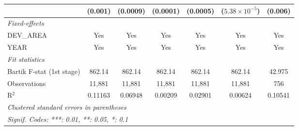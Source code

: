 \begin{table}[htbp]
{\begin{tabular}{lcccccc}
                                          & (0.001)                                   & (0.0009)                                    & (0.0001)                                        & (0.0005)                                  & ($5.38\times 10^{-5}$)                     & (0.006)\\   
      \midrule
      \emph{Fixed-effects}\\
      DEV\_AREA                           & Yes                                       & Yes                                         & Yes                                             & Yes                                       & Yes                                        & Yes\\  
      YEAR                                & Yes                                       & Yes                                         & Yes                                             & Yes                                       & Yes                                        & Yes\\  
      \midrule
      \emph{Fit statistics}\\
      Bartik F-stat (1st stage)   & 862.14                                    & 862.14                                      & 862.14                                          & 862.14                                    & 862.14                                     & 42.975\\  
      Observations                        & 11,881                                    & 11,881                                      & 11,881                                          & 11,881                                    & 11,881                                     & 756\\  
      R$^2$                               & 0.11163                                   & 0.06948                                     & 0.00209                                         & 0.02901                                   & 0.00624                                    & 0.10541\\  
      \midrule \midrule
      \multicolumn{7}{l}{\emph{Clustered standard errors in parentheses}}\\
      \multicolumn{7}{l}{\emph{Signif. Codes: ***: 0.01, **: 0.05, *: 0.1}}\\
   \end{tabular}}
\end{table}


